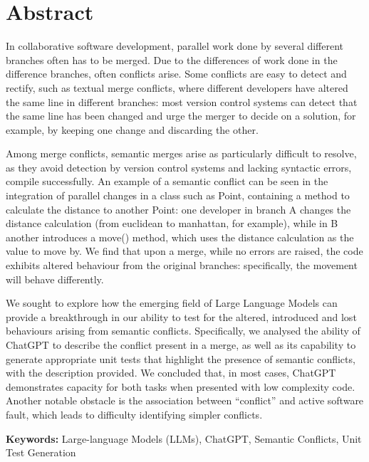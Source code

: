 
\chapter*{Abstract}

In collaborative software development, parallel work done by several different branches often has to be merged. Due to the differences of work done in the difference branches, often conflicts arise. Some conflicts are easy to detect and rectify, such as textual merge conflicts, where different developers have altered the same line in different branches: most version control systems can detect that the same line has been changed and urge the merger to decide on a solution, for example, by keeping one change and discarding the other.

Among merge conflicts, semantic merges arise as particularly difficult to resolve, as they avoid detection by version control systems and lacking syntactic errors, compile successfully.
An example of a semantic conflict can be seen in the integration of parallel changes in a class such as Point, containing a method to calculate the distance to another Point: one developer in branch A changes the distance calculation (from euclidean to manhattan, for example), while in B another introduces a move() method, which uses the distance calculation as the value to move by. We find that upon a merge, while no errors are raised, the code exhibits altered behaviour from the original branches: specifically, the movement will behave differently.

We sought to explore how the emerging field of Large Language Models can provide a breakthrough in our ability to test for the altered, introduced and lost behaviours arising from semantic conflicts. 
Specifically, we analysed the ability of ChatGPT to describe the conflict present in a merge, as well as its capability to generate appropriate unit tests that highlight the presence of semantic conflicts, with the description provided.
We concluded that, in most cases, ChatGPT demonstrates capacity for both tasks when presented with low complexity code. Another notable obstacle is the association between ``conflict'' and active software fault, which leads to difficulty identifying simpler conflicts.

\bigskip\noindent
\textbf{Keywords:} Large-language Models (LLMs), ChatGPT, Semantic Conflicts, Unit Test Generation
